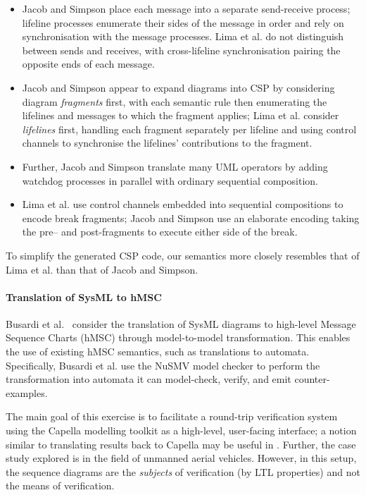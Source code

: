 \begin{itemize}
\item
  Jacob and Simpson place each message into a
  separate send-receive process; lifeline processes enumerate their
  sides of the message in order and rely on
  synchronisation with the message processes.
  Lima et al. do not
  distinguish between sends and receives, with
  cross-lifeline synchronisation pairing the opposite
  ends of each message.
\item
  Jacob and Simpson appear to expand diagrams into CSP by
  considering diagram \emph{fragments} first, with each semantic rule
  then enumerating the lifelines and messages to which the fragment applies;
  Lima et al. consider \emph{lifelines} first, handling each fragment
  separately per lifeline and using control channels to synchronise the
  lifelines' contributions to the fragment.
\item
  Further, Jacob and Simpson translate many UML operators by adding watchdog
  processes in parallel with ordinary sequential composition.
\item
  Lima et al. use control channels embedded into sequential compositions to
  encode break fragments;
  Jacob and Simpson use an elaborate encoding taking the pre-- and
  post-fragments to execute either side of the break.
\end{itemize}

To simplify the generated CSP code, our semantics more closely resembles that of
Lima et al. than that of Jacob and Simpson.

\paragraph{Translation of SysML to hMSC}

Busardi et al.~\cite{Busard21-SDviaHMSC} consider the translation of SysML diagrams to high-level Message Sequence
Charts (hMSC) through model-to-model transformation.  This enables
the use of existing hMSC semantics, such as translations to
automata.  Specifically, Busardi et al. use the NuSMV model
checker to perform the transformation into automata it can
model-check, verify, and emit counter-examples.

The main goal of this exercise is to facilitate a round-trip
verification system using the Capella modelling toolkit as a
high-level, user-facing interface; a notion similar to translating results
back to Capella may be useful in \langname.  Further, the case study explored is
in the field of unmanned aerial vehicles.
However, in this setup, the
sequence diagrams are the \emph{subjects} of verification (by LTL properties)
and not the means of verification.


